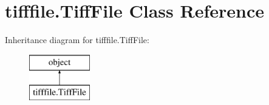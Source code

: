 \hypertarget{classtifffile_1_1_tiff_file}{\section{tifffile.\-Tiff\-File Class Reference}
\label{classtifffile_1_1_tiff_file}
}
Inheritance diagram for tifffile.\-Tiff\-File\-:\begin{figure}[H]
\begin{center}
\leavevmode
\includegraphics[height=2.000000cm]{classtifffile_1_1_tiff_file}
\end{center}
\end{figure}
